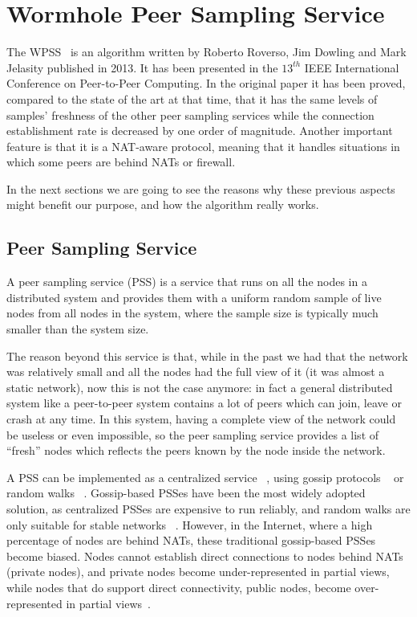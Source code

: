 
\chapter{Wormhole Peer Sampling Service}
\label{cha:wormhole}
The \ac{WPSS}~\cite{wormhole} is an algorithm written by Roberto Roverso, Jim Dowling and Mark Jelasity published in 2013. It has been presented in the $13^{th}$ IEEE International Conference on Peer-to-Peer Computing. In the original paper it has been proved, compared to the state of the art at that time, that it has the same levels of samples' freshness  of the other peer sampling services while the connection establishment rate is decreased by one order of magnitude. Another important feature is that it is a NAT-aware protocol, meaning that it handles situations in which some peers are behind NATs or firewall.

In the next sections we are going to see the reasons why these previous aspects might benefit our purpose, and how the algorithm really works.

\section{Peer Sampling Service}
\label{sec:pss}
A peer sampling service (PSS) is a service that runs on all the nodes in a distributed system and provides them with a uniform random sample of live nodes from all nodes in the system, where the sample size is typically much smaller than the system size. 

The reason beyond this service is that, while in the past we had that the network was relatively small and all the nodes had the full view of it (it was almost a static network), now this is not the case anymore: in fact a general distributed system like a peer-to-peer system contains a lot of peers which can join, leave or crash at any time. In this system, having a complete view of the network could be useless or even impossible, so the peer sampling service provides a list of ``fresh'' nodes which reflects the peers known by the node inside the network.

A PSS can be implemented as a centralized service ~\cite{spotify}, using gossip protocols ~\cite{gossip_protocol} or random walks ~\cite{rw}. Gossip-based PSSes have been the most widely adopted solution, as centralized PSSes are expensive to run reliably, and random walks are only suitable for stable networks ~\cite{rw}. However, in the Internet, where a high percentage of nodes are behind NATs, these traditional gossip-based PSSes become biased. Nodes cannot establish direct connections to nodes behind NATs (private nodes), and private nodes become under-represented in partial views, while nodes that do support direct connectivity, public nodes, become over-represented in partial views~\cite{gozar}. 

